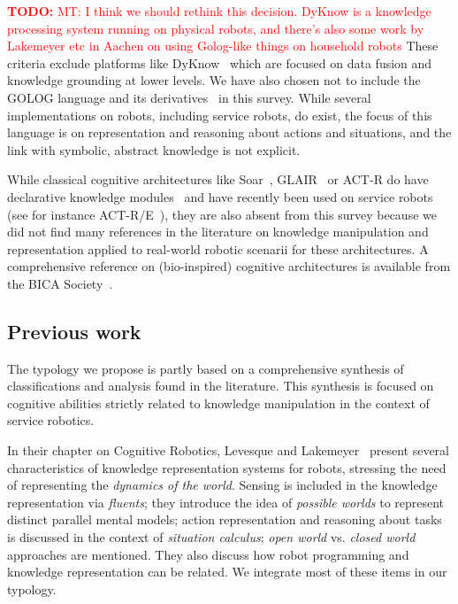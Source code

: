 \documentclass[journal]{IEEEtran}
\newcommand{\todo}[1]{\textcolor{red}{\textbf{TODO:} #1}}
\begin{document}
\todo{MT: I think we should rethink this decision. DyKnow is a knowledge 
      processing system running on physical robots, and there's also some
      work by Lakemeyer etc in Aachen on using Golog-like things on household 
      robots}
These criteria exclude platforms like {\sc DyKnow}~\cite{Heintz2004}
which are focused on data fusion and knowledge grounding at lower levels.
% 
We have also chosen not to include the GOLOG language and its
derivatives~\cite{levesque1997golog, Ferrein2008, Gspandl2011} in this survey. While
several implementations on robots, including service robots, do exist, the
focus of this language is on representation and reasoning about actions and
situations, and the link with symbolic, abstract knowledge is not explicit.

While classical cognitive architectures like {\sc Soar}~\cite{Lehman2006},
GLAIR~\cite{Shapiro2009} or {\sc ACT-R} do have declarative knowledge
modules~\cite{Derbinsky2010} and have recently been used on service robots (see
 for instance {\sc ACT-R/E}~\cite{Kennedy2009}), they are also absent from this
survey because we did not find many references in the literature on knowledge
manipulation and representation applied to real-world robotic scenarii for
these architectures.
% 
A comprehensive reference on (bio-inspired) cognitive architectures is
available from the BICA Society~\cite{BicaCogArch2011}.


\subsection{Previous work}
\label{sect|evaluation-literature}

The typology we propose is partly based on a comprehensive synthesis of
classifications and analysis found in the literature. This synthesis is focused
on cognitive abilities strictly related to knowledge manipulation in the
context of service robotics.

In their chapter on Cognitive Robotics, Levesque and Lakemeyer~\cite{Levesque2008} 
present several characteristics of knowledge representation systems
for robots, stressing the need of representing the \emph{dynamics of the
world}.  Sensing is included in the knowledge representation via
\emph{fluents}; they introduce the idea of \emph{possible worlds} to represent
distinct parallel mental models; action representation and reasoning about
tasks is discussed in the context of \emph{situation calculus}; \emph{open
world} vs. \emph{closed world} approaches are mentioned.  They also discuss how
robot programming and knowledge representation can be related. We integrate
most of these items in our typology.
\end{document}
